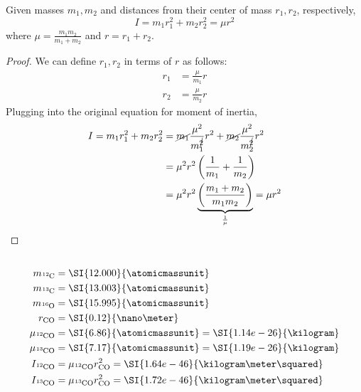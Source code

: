 \documentclass{article}
\begin{document}
\begin{theorem}
    Given masses \(m_1, m_2\) and distances from their center of mass \(r_1, r_2\), respectively,
    \begin{equation}
        I = m_1 r_1^2 + m_2 r_2^2 = \mu r^2
    \end{equation}
    where \(\mu = \frac{m_1 m_2}{m_1 + m_2}\) and \(r = r_1 + r_2\).
\end{theorem}
\begin{proof}
    We can define \(r_1, r_2\) in terms of \(r\) as follows:
    \begin{align}
        r_1 &= \frac{\mu}{m_1} r \\
        r_2 &= \frac{\mu}{m_2} r
    \end{align}
    Plugging into the original equation for moment of inertia,
    \begin{align}
        I = m_1 r_1^2 + m_2 r_2^2 &= \cancel{m_1} \frac{\mu^2}{m_1^{\cancel{2}}} r^2 + \cancel{m_2} \frac{\mu^2}{m_2^{\cancel{2}}} r^2 \\
        &= \mu^2 r^2 \left(\frac{1}{m_1} + \frac{1}{m_2}\right) \\
        &= \mu^2 r^2 \underbrace{\left(\frac{m_1 + m_2}{m_1 m_2}\right)}_{\frac{1}{\mu}} = \mu r^2
    \end{align}
\end{proof}

\subsection{}

\begin{align}
    m_{\ce{^{12}C}} &= \SI{12.000}{\atomicmassunit} \\
    m_{\ce{^{13}C}} &= \SI{13.003}{\atomicmassunit} \\
    m_{\ce{^{16}O}} &= \SI{15.995}{\atomicmassunit} \\
    r_{\ce{CO}} &= \SI{0.12}{\nano\meter} \\
    \mu_{\ce{^{12}CO}} &= \SI{6.86}{\atomicmassunit} = \SI{1.14e-26}{\kilogram} \\
    \mu_{\ce{^{13}CO}} &= \SI{7.17}{\atomicmassunit} = \SI{1.19e-26}{\kilogram} \\
    I_{\ce{^{12}CO}} &= \mu_{\ce{^{12}CO}} r_{\ce{CO}}^2 = \SI{1.64e-46}{\kilogram\meter\squared} \\
    I_{\ce{^{13}CO}} &= \mu_{\ce{^{13}CO}} r_{\ce{CO}}^2 = \SI{1.72e-46}{\kilogram\meter\squared}
\end{align}
\end{document}
